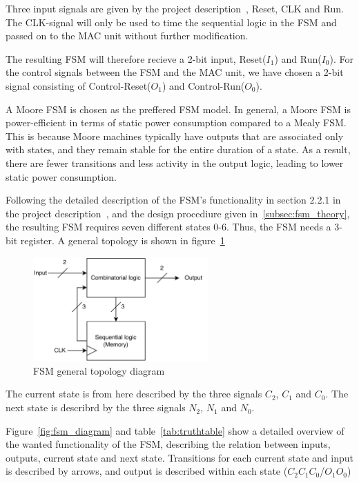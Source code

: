 Three input signals are given by the project description~\cite{project_description}, Reset, CLK and Run. The CLK-signal will only be used to time the sequential logic in the FSM and passed on to the MAC unit without further modification.

The resulting FSM will therefore recieve a 2-bit input, Reset($I_1$) and Run($I_0$). For the control signals between the FSM and the MAC unit, we have chosen a 2-bit signal consisting of Control-Reset($O_1$) and Control-Run($O_0$). 

A Moore FSM is chosen as the preffered FSM model. In general, a Moore FSM is power-efficient in terms of static power consumption compared to a Mealy FSM. This is because Moore machines typically have outputs that are associated only with states, and they remain stable for the entire duration of a state. As a result, there are fewer transitions and less activity in the output logic, leading to lower static power consumption.

Following the detailed description of the FSM's functionality in section 2.2.1 in the project description~\cite{project_description}, and the design procediure given in~\ref{subsec:fsm_theory}, the resulting FSM requires seven different states 0-6. Thus, the FSM needs a 3-bit register. A general topology is shown in figure~\ref{fig:fsm_overordnet}

\begin{figure}[H]
    \centering
    \includegraphics[width=0.6\textwidth]{Figures/FSM_overordnet.drawio.png}
    \caption{FSM general topology diagram}
    \label{fig:fsm_overordnet}
\end{figure}

The current state is from here described by the three signals $C_2$, $C_1$ and $C_0$. The next state is describrd by the three signals $N_2$, $N_1$ and $N_0$.

Figure~\ref{fig:fsm_diagram} and table~\ref{tab:truthtable} show a detailed overview of the wanted functionality of the FSM, describing the relation between inputs, outputs, current state and next state. Transitions for each current state and input is described by arrows, and output is described within each state ($C_2 C_1 C_0$/$O_1 O_0$)

